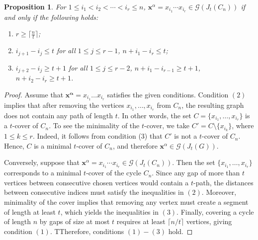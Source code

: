 \documentclass[12pt]{amsart}
\newtheorem{proposition}{Proposition}[section]
\begin{document}
\begin{proposition}\label{prop: mingens of J_t(C_n)}
	For $1\leq i_1<i_2<\cdots < i_r\leq n$, $\mathbf{x}^{\alpha}=x_{i_1}\cdots x_{i_r}\in \mathcal{G}(J_t(C_n))$ if and only if the following holds:
	\begin{enumerate}
		\item $r\geq \lceil \frac{n}{t} \rceil$;
		\item $i_{j+1}-i_{j}\leq t$ for all $1\leq j \leq r-1$, $n+i_{1}-i_{r}\leq t$;
		\item $i_{j+2}-i_{j}\geq t+1$ for all $1\leq j\leq r-2$, $n+i_{1}-i_{r-1}\geq t+1$, $n+i_{2}-i_{r}\geq t+1$.
	\end{enumerate}
\end{proposition}
\begin{proof}
Assume that $\mathbf{x^{\alpha}} = x_{i_1}\ldots x_{i_r}$ satisfies the given conditions. Condition $(2)$ implies that after removing the vertices $x_{i_1},\ldots,x_{i_r}$ from $C_n$, the resulting graph does not contain any path of length $t$. In other words, the set $C = \{x_{i_1},\ldots,x_{i_r}\}$ is a $t$-cover of $C_n$. To see the minimality of the $t$-cover, we take $C' = C\setminus \{x_{i_k}\}$, where $1\leq k\leq r$. Indeed, it follows from condition (3) that $C'$ is not a $t$-cover of $C_n$. Hence, $C$ is a minimal $t$-cover of $C_n$, and therefore $\mathbf{x}^{\alpha}\in \mathcal{G}(J_t(G))$.

Conversely, suppose that $\mathbf{x}^{\alpha}=x_{i_1}\cdots x_{i_r}\in \mathcal{G}(J_t(C_n))$. Then the set $\{x_{i_1},\dots,x_{i_r}\}$ corresponds to a minimal $t$-cover of the cycle $C_n$. Since any gap of more than $t$ vertices between consecutive chosen vertices would contain a $t$-path, the distances between consecutive indices must satisfy the inequalities in $(2)$. Moreover, minimality of the cover implies that removing any vertex must create a segment of length at least $t$, which yields the inequalities in $(3)$. Finally, covering a cycle of length $n$ by gaps of size at most $t$ requires at least $\lceil n/t\rceil$ vertices, giving condition $(1)$. TTherefore, conditions $(1)-(3)$ hold.
\end{proof}
\end{document}
